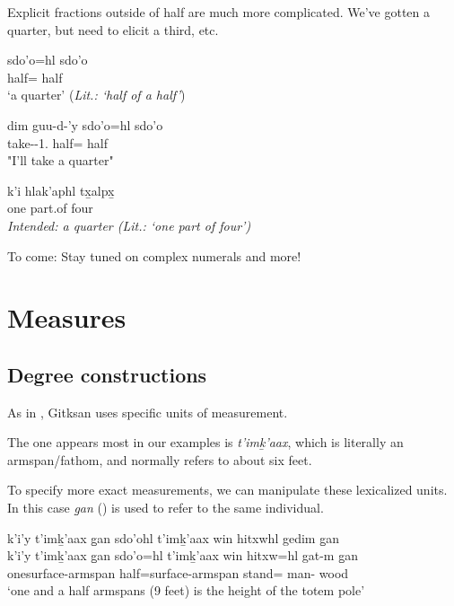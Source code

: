 \documentclass{article}
\begin{document}
Explicit fractions outside of half are much more complicated. We've gotten a quarter, but need to elicit a third, etc.
\begin{exe}
    \ex \begin{xlist}
    \item \gll sdo'o=hl sdo'o\\
half=\Cn{} half\\
`a quarter' (\textit{Lit.: `half of a half'})
\item \gll dim guu-d-'y sdo'o=hl sdo'o\\
\Fut{} take-\T{}-1.\Ii{} half=\Cn{} half\\
"I'll take a quarter"
\item \gll * k'i hlak'aphl tx̱alpx̱ \\
{} one part.of four\\
\textit{Intended: a quarter (Lit.: `one part of four')}
    \end{xlist} 
\end{exe}
To come: Stay tuned on complex numerals and more!

\section{Measures}
\subsection{Degree constructions}

As in \textcite{aonukiDifferentialMeasurePhrases2025}, Gitksan uses specific units of measurement. 

The one appears most in our examples is \textit{t'imḵ'aax}, which is literally an armspan/fathom, and normally refers to about six feet.

To specify more exact measurements, we can manipulate these lexicalized units. In this case \textit{g̱an} (\Pcnj{}) is used to refer to the same individual.

\begin{exe}
    \ex \glll 
    k'i'y t’imḵ’aax g̱an sdo'ohl t’imḵ’aax win hitxwhl gedim g̱an \\
    k'i'y t’imḵ’aax g̱an sdo'o=hl t’imḵ’aax win hitxw=hl gat-m g̱an \\
    onesurface-armspan \Pcnj{} half=\Cn{}surface-armspan \Comp{} stand=\Cn{} man-\Attr{} wood \\
    \glt `one and a half armspans (9 feet) is the height of the totem pole'
\end{exe}
\end{document}
